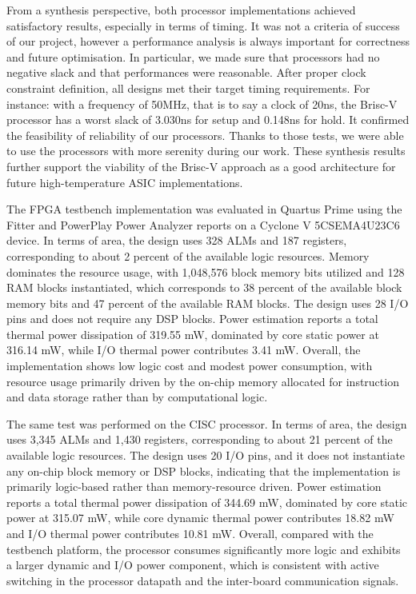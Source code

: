 \documentclass[12pt]{article}
\begin{document}
From a synthesis perspective, both processor implementations achieved satisfactory results, especially in terms of timing. It was not a criteria of success of our project, however a performance analysis is always important for correctness and future optimisation. In particular, we made sure that processors had no negative slack and that performances were reasonable. After proper clock constraint definition, all designs met their target timing requirements. For instance: with a frequency of 50MHz, that is to say a clock of 20ns, the Brisc-V processor has a worst slack of 3.030ns for setup and 0.148ns for hold. It confirmed the feasibility of reliability of our processors. Thanks to those tests, we were able to use the processors with more serenity during our work. These synthesis results further support the viability of the Brisc-V approach as a good architecture for future high-temperature ASIC implementations. 


The FPGA testbench implementation was evaluated in Quartus Prime using the Fitter and PowerPlay Power Analyzer reports on a Cyclone V 5CSEMA4U23C6 device. In terms of area, the design uses 328 ALMs and 187 registers, corresponding to about 2 percent of the available logic resources. Memory dominates the resource usage, with 1,048,576 block memory bits utilized and 128 RAM blocks instantiated, which corresponds to 38 percent of the available block memory bits and 47 percent of the available RAM blocks. The design uses 28 I/O pins and does not require any DSP blocks. Power estimation reports a total thermal power dissipation of 319.55 mW, dominated by core static power at 316.14 mW, while I/O thermal power contributes 3.41 mW. Overall, the implementation shows low logic cost and modest power consumption, with resource usage primarily driven by the on-chip memory allocated for instruction and data storage rather than by computational logic.

The same test was performed on the CISC processor. In terms of area, the design uses 3,345 ALMs and 1,430 registers, corresponding to about 21 percent of the available logic resources. The design uses 20 I/O pins, and it does not instantiate any on-chip block memory or DSP blocks, indicating that the implementation is primarily logic-based rather than memory-resource driven. Power estimation reports a total thermal power dissipation of 344.69 mW, dominated by core static power at 315.07 mW, while core dynamic thermal power contributes 18.82 mW and I/O thermal power contributes 10.81 mW. Overall, compared with the testbench platform, the processor consumes significantly more logic and exhibits a larger dynamic and I/O power component, which is consistent with active switching in the processor datapath and the inter-board communication signals.
\end{document}
